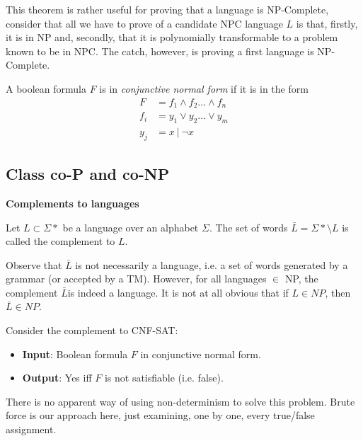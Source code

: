 This theorem is rather useful for proving that a language is NP-Complete,
consider that all we have to prove of a candidate NPC language $L$ is that, firstly,
it is in NP and, secondly, that it is polynomially transformable to a problem known to be in NPC.
The catch, however, is proving a first language is NP-Complete.

\begin{definition}
    A boolean formula $F$ is in \textit{conjunctive normal form} if it is in the form
    \begin{equation}
        \begin{split}
            F &= f_1 \land f_2 \dots \land f_n \\
            f_i &= y_1 \lor y_2 \dots \lor y_m \\
            y_j &= x\ |\ \neg x
        \end{split}
    \end{equation}
\end{definition}

\subsection{Class co-P and co-NP}
\textbf{Complements to languages}
\begin{definition}
    Let $L \subset \Sigma\ast$ be a language over an alphabet $\Sigma$.
    The set of words $\bar{L} = \Sigma\ast \setminus L$ is called the complement to $L$.
\end{definition}

Observe that $\bar{L}$ is not necessarily a language,
i.e. a set of words generated by a grammar (or accepted by a TM).
However, for all languages $\in$ NP, the complement $\bar{L}$is indeed a language.
It is not at all obvious that if $L \in NP$, then $\bar{L} \in NP$.

\begin{example}
    Consider the complement to CNF-SAT:
    \begin{itemize}
        \item \textbf{Input}: Boolean formula $F$ in conjunctive normal form.
        \item \textbf{Output}: Yes iff $F$ is not satisfiable (i.e. false).
    \end{itemize}
    There is no apparent way of using non-determinism to solve this problem.
    Brute force is our approach here, just examining, one by one, every true/false assignment.
\end{example}

